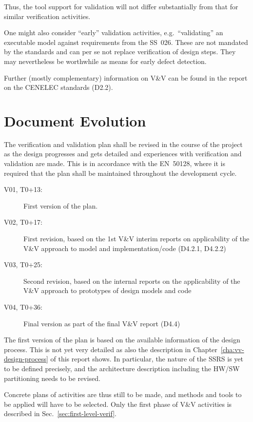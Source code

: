 \documentclass{template/openetcs_report}
\begin{document}
Thus, the tool support for validation will not differ substantially
from that for similar verification activities.

One might also consider ``early'' validation activities, e.g.\
``validating'' an executable model against requirements from the
SS~026. These are not mandated by the standards and can per se not
replace  verification of design steps. They may nevertheless be worthwhile
as means for early defect detection.

Further (mostly complementary) information on V\&V can be found in the
report on the CENELEC standards (D2.2).

\chapter{Document Evolution}

The verification and validation plan shall be revised in the course of
the project as the design progresses and gets detailed and experiences
with verification and validation are made. This is in accordance with
the EN~50128, where it is required that the plan shall be maintained
throughout the development cycle.

\begin{description}
\item[V01, T0+13:] First version of the plan. 
\item[V02, T0+17:] First revision, based on the 1st V\&V interim
  reports on applicability of the V\&V approach to model and
  implementation/code (D4.2.1, D4.2.2)
\item[V03, T0+25:] Second revision, based on the internal reports on
  the applicability of the V\&V approach to prototypes of design
  models and code
\item[V04, T0+36:] Final version as part of the final V\&V report (D4.4) 
\end{description}

The first version of the plan is based on the available information of
the design process. This is not yet very detailed as also the
description in Chapter~\ref{cha:vv-design-process} of this report
shows. In particular, the nature of the SSRS is yet to be defined
precisely, and the architecture description including the HW/SW
partitioning needs to be revised.

Concrete plans of activities are thus still to be made, and methods
and tools to be applied will have to be selected. Only the first phase
of V\&V activities is described in Sec.~\ref{sec:first-level-verif}.
\end{document}
